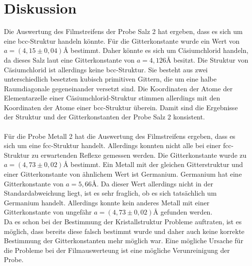 \section{Diskussion}
Die Auswertung des Filmstreifens der  Probe Salz 2 hat ergeben, dass es sich um eine bcc-Struktur
handeln könnte.
Für die Gitterkonstante wurde ein Wert von  $a = \left(4,15\pm0,04\right)\si{\angstrom}$ bestimmt.
Daher könnte es sich um Cäsiumchlorid handeln, da dieses Salz  laut \cite{wiki} eine Gitterkonstante von
$a=4,126\si{\angstrom}$ besitzt.
Die Struktur von Cäsiumchlorid ist allerdings keine bcc-Struktur.
Sie besteht aus zwei unterschiedlich besetzten kubisch primitiven Gittern, die um eine halbe Raumdiagonale gegeneinander versetzt sind.
Die Koordinaten der Atome der Elementarzelle einer Cäsiumchlorid-Struktur stimmen allerdings mit den Koordinaten der Atome einer bcc-Struktur überein.
Damit sind die Ergebnisse der Struktur und der Gitterkonstanten der Probe Salz 2 konsistent. \\
 ~\\
Für die Probe Metall 2 hat die Auswertung des Filmstreifens ergeben, dass es sich um eine fcc-Struktur handelt.
Allerdings konnten nicht alle bei einer fcc-Struktur zu erwartenden Reflexe gemessen werden.
Die Gitterkonstante wurde zu $a = \left(4,73\pm0,02\right)\si{\angstrom}$ bestimmt.
Ein Metall mit der gleichen Gitterstruktur und einer Gitterkonstante von ähnlichem Wert ist Germanium.
Germanium hat eine Gitterkonstante von $a = 5,66\si{\angstrom}$\cite{kiel}.
Da dieser Wert allerdings nicht in der Standardabweichung liegt, ist es sehr fraglich, ob es sich tatsächlich um Germanium handelt.
Allerdings konnte kein anderes Metall mit einer Gitterkonstante von ungefähr  $a = \left(4,73\pm0,02\right)\si{\angstrom}$ gefunden werden.\\
Da es schon bei der Bestimmung der Kristallstruktur Probleme auftraten, ist es möglich, dass  bereits diese falsch bestimmt wurde und daher auch keine korrekte Bestimmung der Gitterkonstanten mehr möglich war.
Eine mögliche Ursache für die Probleme bei der Filmauswerteung ist eine mögliche Verunreinigung der Probe.

